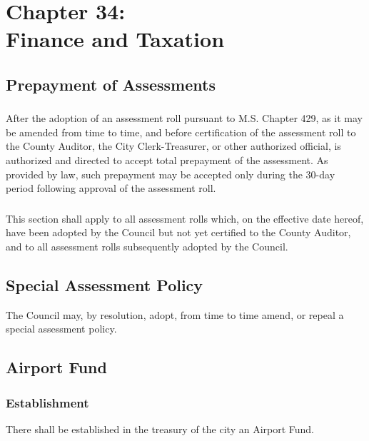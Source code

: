 \chapter*{Chapter 34: \\
	Finance and Taxation}
    \vfill
    \minitoc
    \pagebreak
    
\section{Prepayment of Assessments}
\subsection{}
After the adoption of an assessment roll pursuant to M.S. Chapter 429, as it may be amended from time to time, and before certification of the assessment roll to the County Auditor, the City Clerk-Treasurer, or other authorized official, is authorized and directed to accept total prepayment of the assessment.  As provided by law, such prepayment may be accepted only during the 30-day period following approval of the assessment roll.
\subsection{}
This section shall apply to all assessment rolls which, on the effective date hereof, have been adopted by the Council but not yet certified to the County Auditor, and to all assessment rolls subsequently adopted by the Council.

\section{Special Assessment Policy}
The Council may, by resolution, adopt, from time to time amend, or repeal a special assessment policy.

\section{Airport Fund}
\subsection{Establishment}
There shall be established in the treasury of the city an Airport Fund.
